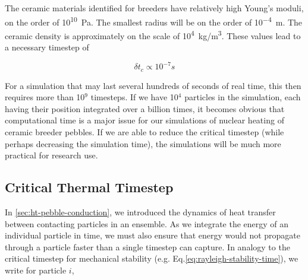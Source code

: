 
The ceramic materials identified for breeders have relatively high Young's moduli, on the order of \si{10^{10} Pa}. The smallest radius will be on the order of \si{10^{-4} m}. The ceramic density is approximately on the scale of \si{10^{4} kg/m^3}. These values lead to a necessary timestep of

\begin{equation}
	\delta t_c \propto 10^{-7} \si{s}
\end{equation}

For a simulation that may last several hundreds of seconds of real time, this then requires more than 10$^9$ timesteps. If we have 10$^4$ particles in the simulation, each having their position integrated over a billion times, it becomes obvious that computational time is a major issue for our simulations of nuclear heating of ceramic breeder pebbles. If we are able to reduce the critical timestep (while perhaps decreasing the simulation time), the simulations will be much more practical for research use.




\subsection{Critical Thermal Timestep}

In \cref{sec:ht-pebble-conduction}, we introduced the dynamics of heat transfer between contacting particles in an ensemble. As we integrate the energy of an individual particle in time, we must also ensure that energy would not propagate through a particle faster than a single timestep can capture. In analogy to the critical timestep for mechanical stability (e.g. Eq.\ref{eq:rayleigh-stability-time}), we write for particle $i$,

